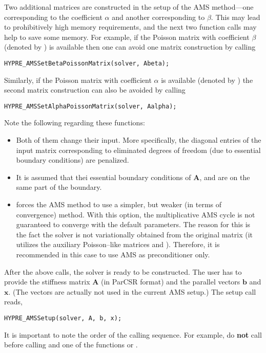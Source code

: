 Two additional matrices are constructed in the setup of the
AMS method---one corresponding to the coefficient $\alpha$
and another corresponding to $\beta$.
This may  lead to prohibitively high memory requirements, and
the next two function calls may help to save some memory.
For example, if the Poisson matrix with coefficient $\beta$
(denoted by ) is
available then one can avoid one matrix construction by calling
\begin{display}\begin{verbatim}
HYPRE_AMSSetBetaPoissonMatrix(solver, Abeta);
\end{verbatim}\end{display}
Similarly, if the Poisson matrix with coefficient $\alpha$ is available
(denoted by )
the second matrix construction can also be avoided by calling
\begin{display}\begin{verbatim}
HYPRE_AMSSetAlphaPoissonMatrix(solver, Aalpha);
\end{verbatim}\end{display}
Note the following regarding these functions:
\begin{itemize}
\item Both of them change their input. More specifically,
the diagonal entries of the input matrix corresponding to eliminated
degrees of freedom (due to essential boundary conditions)
are penalized.
\item It is assumed that thei essential boundary conditions of
${\mathbf A}$,  and  are on the same
part of the boundary.
\item {} forces the
AMS method to use a simpler, but weaker (in terms of convergence) method.
With this option, the multiplicative AMS cycle
is not guaranteed to converge with the
default parameters. The reason for this is the fact the solver is not
variationally obtained from the original matrix (it utilizes
the auxiliary Poisson--like matrices  and ).
Therefore, it is recommended in this case to use AMS as preconditioner
only.
\end{itemize}

After the above calls, the solver is ready to be constructed.
The user has to provide the stiffness matrix ${\mathbf A}$ (in ParCSR format) and
the \hypre{} parallel vectors ${\mathbf b}$ and ${\mathbf x}$. (The vectors
are actually not used in the current AMS setup.) The setup call reads,
\begin{display}\begin{verbatim}
HYPRE_AMSSetup(solver, A, b, x);
\end{verbatim}\end{display}
It is important to note the order of the calling sequence. For example, do {\bf not}
call  before calling
and one of the functions
 or .

